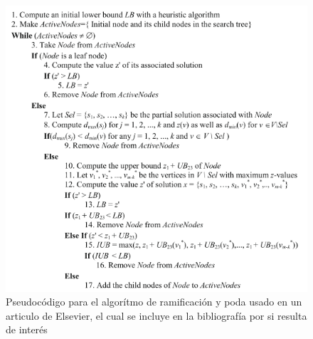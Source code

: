 \begin{figure}[h]
    \centering
    \includegraphics[scale=0.8]{images/RamYPod.png}
    \caption{Pseudocódigo para el algorítmo de ramificación y poda usado en un articulo de Elsevier, el cual se incluye en la bibliografía por si resulta de interés}
    \label{fig:RYP}
\end{figure}